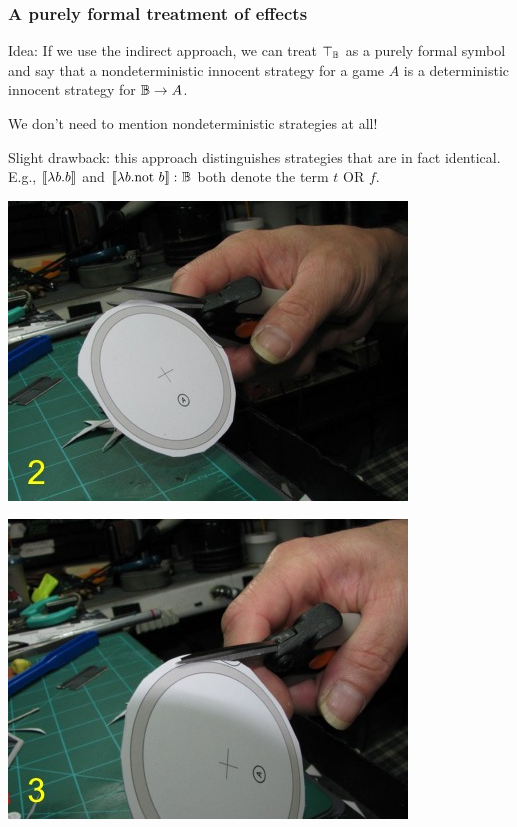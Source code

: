\documentclass{beamer}
\begin{document}
\begin{frame}
  \frametitle{A purely formal treatment of effects}

  Idea: If we use the indirect approach, we can treat $\top_{\mathbb{B}}$ as a purely formal symbol and say that a nondeterministic innocent strategy for a game $A$ is a deterministic innocent strategy for $\mathbb{B}\to A$.
  \pause

  We don't need to mention nondeterministic strategies at all!
  \pause

  Slight drawback: this approach distinguishes strategies that are in fact identical.  
  E.g., $\left\llbracket\lambda b.b\right\rrbracket$ and $\left\llbracket\lambda b.\text{not }b\right\rrbracket\colon\mathbb{B}$ both denote the term $t\text{ OR }f$.
  \pause

  \begin{minipage}{0pt}
    \includegraphics{circles_2.jpg}
  \end{minipage}
  \hspace{150pt}
  \begin{minipage}{0.01\textwidth}
    \includegraphics{circles_3.jpg}
  \end{minipage}
\end{frame}
\end{document}
